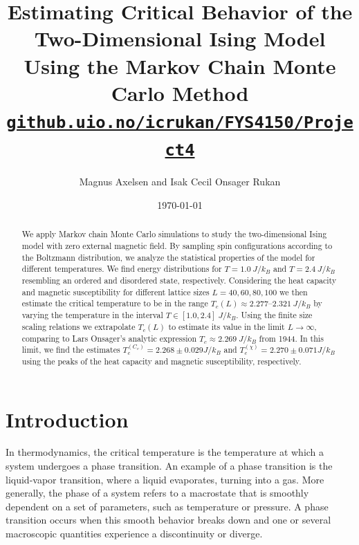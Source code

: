 \documentclass[english,notitlepage,reprint]{revtex4-2}  %
\begin{document}
\title{Estimating Critical Behavior of the Two-Dimensional Ising Model Using the Markov Chain Monte Carlo Method\\[0.5em]
  \small \href{https://github.uio.no/icrukan/FYS4150/tree/master/Project4}{\texttt{github.uio.no/icrukan/FYS4150/Project4}}
}
\author{Magnus Axelsen and Isak Cecil Onsager Rukan} %
\date{\today}                             %
\noaffiliation                            %

\begin{abstract}
    We apply Markov chain Monte Carlo simulations to study the two-dimensional Ising model with zero external magnetic field.
    By sampling spin configurations according to the Boltzmann distribution, we analyze the statistical properties of the model for different temperatures.
    We find energy distributions for \(T=1.0\ \si{J/k_B}\) and \(T=2.4\ \si{J/k_B}\) resembling an ordered and disordered state, respectively.
    Considering the heat capacity and magnetic susceptibility for different lattice sizes \(L=40,60,80,100\) we then estimate the critical temperature to be in the range \(T_c(L)\approx 2.277\text{--}2.321 \ \si{J/k_B}\) by varying the temperature in the interval \(T\in[1.0, 2.4] \ \si{J/k_B}\).
    Using the finite size scaling relations we extrapolate \(T_c(L)\) to estimate its value in the limit $L\rightarrow \infty$, comparing to Lars Onsager's analytic expression \(T_c\approx 2.269 \ \si{J/k_B}\) from 1944.
    In this limit, we find the estimates $T_c^{(C_v)} = 2.268 \pm 0.029 J/k_B$ and $T_c^{(\chi)} = 2.270 \pm 0.071 J/k_B$ using the peaks of the heat capacity and magnetic susceptibility, respectively. 
\end{abstract}
\maketitle

\section{Introduction}
In thermodynamics, the critical temperature is the temperature at which a system undergoes a phase transition. 
An example of a phase transition is the liquid-vapor transition, where a liquid evaporates, turning into a gas. 
More generally, the phase of a system refers to a macrostate that is smoothly dependent on a set of parameters, such as temperature or pressure. A phase transition occurs when this smooth behavior breaks down and one or several macroscopic quantities experience a discontinuity or diverge.
\end{document}
